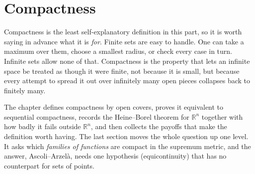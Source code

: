 %
\chapter{Compactness}
\label{ch:compactness}

Compactness is the least self-explanatory definition in this part, so it is worth saying in
advance what it is \emph{for}. Finite sets are easy to handle. One can take a maximum over them,
choose a smallest radius, or check every case in turn. Infinite sets allow none of that.
Compactness is the property that lets an infinite space be treated as though it were finite, not
because it is small, but because every attempt to spread it out over infinitely many open pieces
collapses back to finitely many.

The chapter defines compactness by open covers, proves it equivalent to sequential compactness,
records the Heine--Borel theorem for $\mathbb{R}^n$ together with how badly it fails outside
$\mathbb{R}^n$, and then collects the payoffs that make the definition worth having. The last
section moves the whole question up one level. It asks which \emph{families of functions} are
compact in the supremum metric, and the answer, Ascoli--Arzelà, needs one hypothesis
(equicontinuity) that has no counterpart for sets of points.








